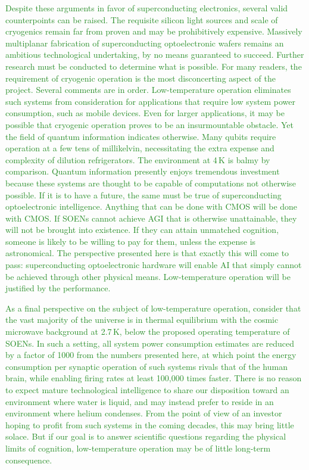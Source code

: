 \documentclass{article}
\begin{document}
\begin{multicols}{2}
\textcolor{ForestGreen}{Despite these arguments in favor of superconducting electronics, several valid counterpoints can be raised. The requisite silicon light sources and scale of cryogenics remain far from proven and may be prohibitively expensive. Massively multiplanar fabrication of superconducting optoelectronic wafers remains an ambitious technological undertaking, by no means guaranteed to succeed. Further research must be conducted to determine what is possible. For many readers, the requirement of cryogenic operation is the most disconcerting aspect of the project. Several comments are in order. Low-temperature operation eliminates such systems from consideration for applications that require low system power consumption, such as mobile devices. Even for larger applications, it may be possible that cryogenic operation proves to be an insurmountable obstacle. Yet the field of quantum information indicates otherwise. Many qubits require operation at a few tens of millikelvin, necessitating the extra expense and complexity of dilution refrigerators. The environment at 4\,K is balmy by comparison. Quantum information presently enjoys tremendous investment because these systems are thought to be capable of computations not otherwise possible. If it is to have a future, the same must be true of superconducting optoelectronic intelligence. Anything that can be done with CMOS will be done with CMOS. If SOENs cannot achieve AGI that is otherwise unattainable, they will not be brought into existence. If they can attain unmatched cognition, someone is likely to be willing to pay for them, unless the expense is astronomical. The perspective presented here is that exactly this will come to pass: superconducting optoelectronic hardware will enable AI that simply cannot be achieved through other physical means. Low-temperature operation will be justified by the performance.}

\textcolor{ForestGreen}{As a final perspective on the subject of low-temperature operation, consider that the vast majority of the universe is in thermal equilibrium with the cosmic microwave background at 2.7\,K, below the proposed operating temperature of SOENs. In such a setting, all system power consumption estimates are reduced by a factor of 1000 from the numbers presented here, at which point the energy consumption per synaptic operation of such systems rivals that of the human brain, while enabling firing rates at least 100,000 times faster. There is no reason to expect mature technological intelligence to share our disposition toward an environment where water is liquid, and may instead prefer to reside in an environment where helium condenses. From the point of view of an investor hoping to profit from such systems in the coming decades, this may bring little solace. But if our goal is to answer scientific questions regarding the physical limits of cognition, low-temperature operation may be of little long-term consequence.}


\end{multicols}
\end{document}
